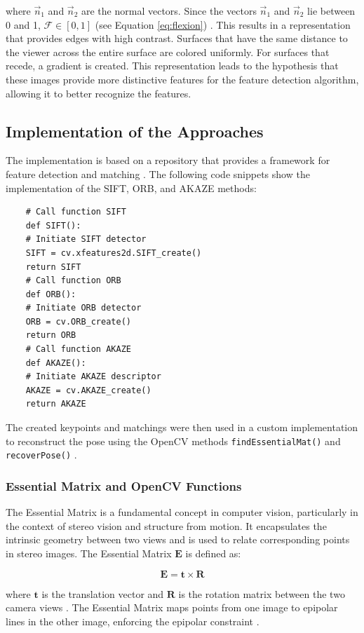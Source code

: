 \documentclass[conference, a4paper]{IEEEtran}
\begin{document}
where \(\vec{n}_1\) and \(\vec{n}_2\) are the normal vectors. Since the vectors \(\vec{n}_1\) and \(\vec{n}_2\) lie between 0 and 1, \(\mathcal{F} \in [0, 1]\) (see Equation \ref{eq:flexion}) \cite{toth}. This results in a representation that provides edges with high contrast. Surfaces that have the same distance to the viewer across the entire surface are colored uniformly. For surfaces that recede, a gradient is created. This representation leads to the hypothesis that these images provide more distinctive features for the feature detection algorithm, allowing it to better recognize the features.


\subsection{Implementation of the Approaches}
The implementation is based on a repository that provides a framework for feature detection and matching \cite{repo}. The following code snippets show the implementation of the SIFT, ORB, and AKAZE methods:

\begingroup
\fontsize{8}{10}\selectfont
\begin{verbatim}
	# Call function SIFT
	def SIFT():
	# Initiate SIFT detector
	SIFT = cv.xfeatures2d.SIFT_create()
	return SIFT
	# Call function ORB
	def ORB():
	# Initiate ORB detector
	ORB = cv.ORB_create()
	return ORB
	# Call function AKAZE
	def AKAZE():
	# Initiate AKAZE descriptor
	AKAZE = cv.AKAZE_create()
	return AKAZE
\end{verbatim}
\endgroup

The created keypoints and matchings were then used in a custom implementation to reconstruct the pose using the OpenCV methods \texttt{findEssentialMat()} and \texttt{recoverPose()} \cite{opencv_docs}.

\subsubsection{Essential Matrix and OpenCV Functions}

The Essential Matrix is a fundamental concept in computer vision, particularly in the context of stereo vision and structure from motion. It encapsulates the intrinsic geometry between two views and is used to relate corresponding points in stereo images. The Essential Matrix \( \mathbf{E} \) is defined as:

\[
\mathbf{E} = \mathbf{t} \times \mathbf{R}
\]

where \( \mathbf{t} \) is the translation vector and \( \mathbf{R} \) is the rotation matrix between the two camera views \cite{baeldung}. The Essential Matrix maps points from one image to epipolar lines in the other image, enforcing the epipolar constraint \cite{opencv_epipolar}.
\end{document}
